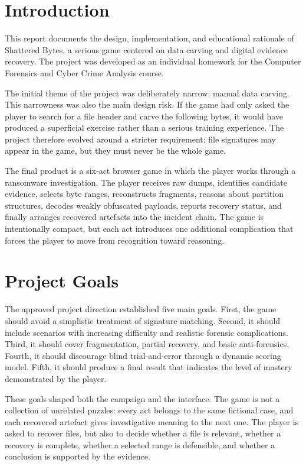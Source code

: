 \documentclass[11pt,a4paper]{article}
\newcommand{\projecttitle}{Shattered Bytes}
\begin{document}
\section{Introduction}

This report documents the design, implementation, and educational rationale of \projecttitle{}, a serious game centered on data carving and digital evidence recovery. The project was developed as an individual homework for the Computer Forensics and Cyber Crime Analysis course.

The initial theme of the project was deliberately narrow: manual data carving. This narrowness was also the main design risk. If the game had only asked the player to search for a file header and carve the following bytes, it would have produced a superficial exercise rather than a serious training experience. The project therefore evolved around a stricter requirement: file signatures may appear in the game, but they must never be the whole game.

The final product is a six-act browser game in which the player works through a ransomware investigation. The player receives raw dumps, identifies candidate evidence, selects byte ranges, reconstructs fragments, reasons about partition structures, decodes weakly obfuscated payloads, reports recovery status, and finally arranges recovered artefacts into the incident chain. The game is intentionally compact, but each act introduces one additional complication that forces the player to move from recognition toward reasoning.

\section{Project Goals}

The approved project direction established five main goals. First, the game should avoid a simplistic treatment of signature matching. Second, it should include scenarios with increasing difficulty and realistic forensic complications. Third, it should cover fragmentation, partial recovery, and basic anti-forensics. Fourth, it should discourage blind trial-and-error through a dynamic scoring model. Fifth, it should produce a final result that indicates the level of mastery demonstrated by the player.

These goals shaped both the campaign and the interface. The game is not a collection of unrelated puzzles: every act belongs to the same fictional case, and each recovered artefact gives investigative meaning to the next one. The player is asked to recover files, but also to decide whether a file is relevant, whether a recovery is complete, whether a selected range is defensible, and whether a conclusion is supported by the evidence.
\end{document}
